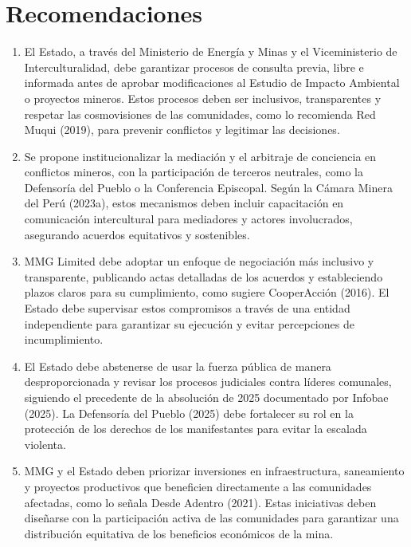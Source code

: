 \documentclass[
  stu,
  floatsintext,
  longtable,
  a4paper,
  nolmodern,
  notxfonts,
  notimes,
  colorlinks=true,linkcolor=blue,citecolor=blue,urlcolor=blue]{apa7}
\begin{document}
\section{Recomendaciones}\label{recomendaciones}

\begin{enumerate}
\def\labelenumi{\arabic{enumi}.}
\item
  El Estado, a través del Ministerio de Energía y Minas y el
  Viceministerio de Interculturalidad, debe garantizar procesos de
  consulta previa, libre e informada antes de aprobar modificaciones al
  Estudio de Impacto Ambiental o proyectos mineros. Estos procesos deben
  ser inclusivos, transparentes y respetar las cosmovisiones de las
  comunidades, como lo recomienda Red Muqui (2019), para prevenir
  conflictos y legitimar las decisiones.
\item
  Se propone institucionalizar la mediación y el arbitraje de conciencia
  en conflictos mineros, con la participación de terceros neutrales,
  como la Defensoría del Pueblo o la Conferencia Episcopal. Según la
  Cámara Minera del Perú (2023a), estos mecanismos deben incluir
  capacitación en comunicación intercultural para mediadores y actores
  involucrados, asegurando acuerdos equitativos y sostenibles.
\item
  MMG Limited debe adoptar un enfoque de negociación más inclusivo y
  transparente, publicando actas detalladas de los acuerdos y
  estableciendo plazos claros para su cumplimiento, como sugiere
  CooperAcción (2016). El Estado debe supervisar estos compromisos a
  través de una entidad independiente para garantizar su ejecución y
  evitar percepciones de incumplimiento.
\item
  El Estado debe abstenerse de usar la fuerza pública de manera
  desproporcionada y revisar los procesos judiciales contra líderes
  comunales, siguiendo el precedente de la absolución de 2025
  documentado por Infobae (2025). La Defensoría del Pueblo (2025) debe
  fortalecer su rol en la protección de los derechos de los
  manifestantes para evitar la escalada violenta.
\item
  MMG y el Estado deben priorizar inversiones en infraestructura,
  saneamiento y proyectos productivos que beneficien directamente a las
  comunidades afectadas, como lo señala Desde Adentro (2021). Estas
  iniciativas deben diseñarse con la participación activa de las
  comunidades para garantizar una distribución equitativa de los
  beneficios económicos de la mina.
\end{enumerate}
\end{document}
